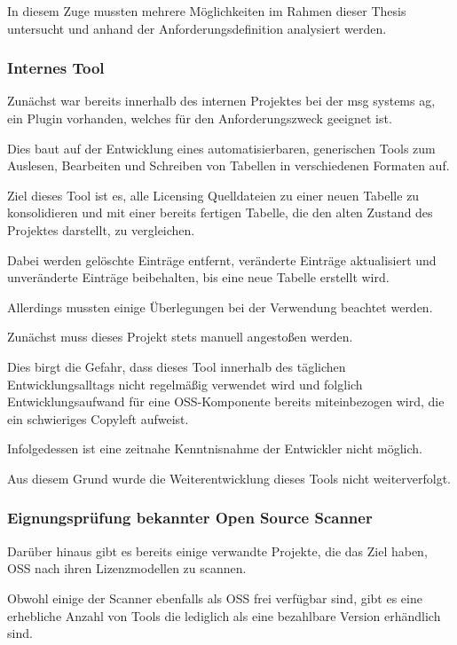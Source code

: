 In diesem Zuge mussten mehrere Möglichkeiten im Rahmen dieser Thesis untersucht und anhand der Anforderungsdefinition analysiert werden.

\subsubsection{Internes Tool}

Zunächst war bereits innerhalb des internen Projektes bei der msg systems ag, ein Plugin vorhanden, welches für den Anforderungszweck geeignet ist. 

Dies baut auf der Entwicklung eines automatisierbaren, generischen Tools zum Auslesen, Bearbeiten und Schreiben von Tabellen in verschiedenen Formaten auf. 

Ziel dieses Tool ist es, alle Licensing Quelldateien zu einer neuen Tabelle zu konsolidieren und mit einer bereits fertigen Tabelle, die den alten Zustand des Projektes darstellt, zu vergleichen. 

Dabei werden gelöschte Einträge entfernt, veränderte Einträge aktualisiert und unveränderte Einträge beibehalten, bis eine neue Tabelle erstellt wird.

Allerdings mussten einige Überlegungen bei der Verwendung beachtet werden. 

Zunächst muss dieses Projekt stets manuell angestoßen werden. 

Dies birgt die Gefahr, dass dieses Tool innerhalb des täglichen Entwicklungsalltags nicht regelmäßig verwendet wird und folglich Entwicklungsaufwand für eine OSS-Komponente bereits miteinbezogen wird, die ein schwieriges Copyleft aufweist. 

Infolgedessen ist eine zeitnahe Kenntnisnahme der Entwickler nicht möglich. 

Aus diesem Grund wurde die Weiterentwicklung dieses Tools nicht weiterverfolgt. 

\subsubsection{Eignungsprüfung bekannter Open Source Scanner}

Darüber hinaus gibt es bereits einige verwandte Projekte, die das Ziel haben, OSS nach ihren Lizenzmodellen zu scannen. 

Obwohl einige der Scanner ebenfalls als OSS frei verfügbar sind, gibt es eine erhebliche Anzahl von Tools die lediglich als eine bezahlbare Version erhändlich sind.  

